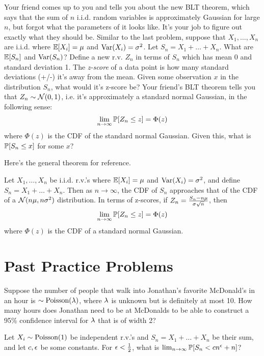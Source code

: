 \documentclass[11 pt]{scrartcl}
\begin{document}
\begin{problem}
    Your friend comes up to you and tells you about the new BLT theorem, which says that the sum of $n$ i.i.d. random variables is approximately Gaussian for large $n$, but forgot what the parameters of it looks like. It's your job to figure out exactly what they should be. Similar to the last problem, suppose that $X_1, \dots, X_n$ are i.i.d. where $\mathbb E[X_i] = \mu$ and $\text{Var}(X_i) = \sigma^2$. 
    \alphanum
        \ii Let $S_n = X_1 + \dots + X_n$. What are $\mathbb E[S_n]$ and $\text{Var}(S_n)$? 
        \ii Define a new r.v. $Z_n$ in terms of $S_n$ which has mean 0 and standard deviation 1. 
        \ii The \emph{z-score} of a data point is how many standard deviations (+/-) it's away from the mean. Given some observation $x$ in the distribution $S_n$, what would it's z-score be? 
        \ii Your friend's BLT theorem tells you that $Z_n\sim \mathcal{N}(0,1)$, i.e. it's approximately a standard normal Gaussian, in the following sense: 
        \[ \lim_{n\to\infty} \mathbb P[Z_n \leq z] = \Phi(z)\] 
        where $\Phi(z)$ is the CDF of the standard normal Gaussian. Given this, what is $\mathbb P[S_n \leq x]$ for some $x$? 
    \enumend
\end{problem}

Here's the general theorem for reference.
\begin{theorem}
    Let $X_1, \dots, X_n$ be i.i.d. r.v.'s where $\mathbb E[X_i] = \mu$ and $\text{Var}(X_i) = \sigma^2$, and define $S_n = X_1 + \dots + X_n$. Then as $n\to\infty$, the CDF of $S_n$ approaches that of the CDF of a $\mathcal{N}(n\mu, n\sigma^2)$ distribution. In terms of z-scores, if $Z_n = \frac{S_n-n\mu}{\sigma\sqrt{n}}$, then 
    \[ \lim_{n\to\infty} \mathbb P[Z_n \leq z] = \Phi(z)\] 
    where $\Phi(z)$ is the CDF of a standard normal Gaussian. 
\end{theorem}


\section{Past Practice Problems}

\begin{problem}[Sp19 Final \#7]
    Suppose the number of people that walk into Jonathan's favorite McDonald's in an hour is $\sim\text{Poisson}(\lambda)$, where $\lambda$ is unknown but is definitely at most 10. How many hours does Jonathan need to be at McDonalds to be able to construct a 95\% confidence interval for $\lambda$ that is of width 2? 
\end{problem}

\begin{problem}[Fa19 Final \#8]
    Let $X_i\sim \text{Poisson}(1)$ be independent r.v.'s and $S_n = X_1 + \dots + X_n$ be their sum, and let $c,\epsilon$ be some constants. For $\epsilon < \frac 12$, what is $\lim_{n\to\infty}\mathbb P[S_n < cn^\epsilon+n]$? 
\end{problem}
\end{document}
